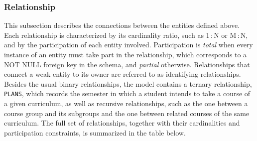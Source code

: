 \subsubsection{Relationship}
\label{subsubsec:db-relationship}

This subsection describes the connections between the entities defined above. Each relationship is characterized by its cardinality ratio, such as 1\,:\,N or M\,:\,N, and by the participation of each entity involved. Participation is \emph{total} when every instance of an entity must take part in the relationship, which corresponds to a NOT NULL foreign key in the schema, and \emph{partial} otherwise. Relationships that connect a weak entity to its owner are referred to as identifying relationships. Besides the usual binary relationships, the model contains a ternary relationship, \texttt{PLANS}, which records the semester in which a student intends to take a course of a given curriculum, as well as recursive relationships, such as the one between a course group and its subgroups and the one between related courses of the same curriculum. The full set of relationships, together with their cardinalities and participation constraints, is summarized in the table below.

